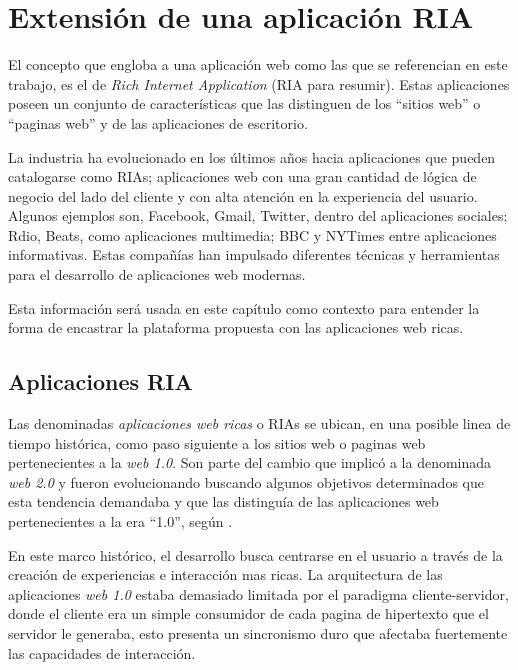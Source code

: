 
\chapter{Extensi\'{o}n de una aplicaci\'{o}n RIA} %

\label{ch:ria_extension} 

El concepto que engloba a una aplicación web como las que se referencian en este trabajo, es el de \emph{Rich Internet Application} (RIA para resumir). Estas aplicaciones poseen un conjunto de características que las distinguen de los ``sitios web'' o ``paginas web'' y de las aplicaciones de escritorio. 

La industria ha evolucionado en los últimos años hacia aplicaciones que pueden catalogarse como RIAs; aplicaciones web con una gran cantidad de lógica de negocio del lado del cliente y con alta atención en la experiencia del usuario. Algunos ejemplos son, Facebook, Gmail, Twitter, dentro del aplicaciones sociales; Rdio, Beats, como aplicaciones multimedia; BBC y NYTimes entre aplicaciones informativas. Estas compañías han impulsado diferentes técnicas y herramientas para el desarrollo de aplicaciones web modernas. 

Esta información será usada en este capítulo como contexto para entender la forma de encastrar la plataforma propuesta con las aplicaciones web ricas.

\section{Aplicaciones RIA} \label{sec:extension_ria_intro}

Las denominadas \emph{aplicaciones web ricas} o RIAs se ubican, en una posible linea de tiempo histórica, como paso siguiente a los sitios web o paginas web pertenecientes a la \emph{web 1.0}. Son parte del cambio que implicó a la denominada \emph{web 2.0} y fueron evolucionando buscando algunos objetivos determinados que esta tendencia demandaba y que las distinguía de las aplicaciones web pertenecientes a la era ``1.0'', según \citet{Farrell2007}. 

En este marco histórico, el desarrollo busca centrarse en el usuario a través de la creación de experiencias e interacción mas ricas. La arquitectura de las aplicaciones \emph{web 1.0} estaba demasiado limitada por el paradigma cliente-servidor, donde el cliente era un simple consumidor de cada pagina de hipertexto que el servidor le generaba, esto presenta un sincronismo duro que afectaba fuertemente las capacidades de interacción.

